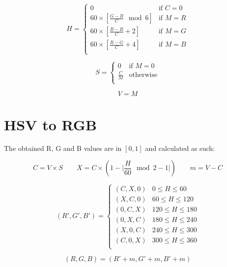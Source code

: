 \documentclass[12pt]{book}
\begin{document}
$$
H =
\begin{cases}
0 & \text{if $C = 0$}\\
60 \times \left[ \frac{G - B}{C} \mod 6\right] & \text{if $M = R$} \\
60 \times \left[ \frac{B - R}{C} + 2\right] & \text{if $M = G$} \\
60 \times \left[ \frac{R - G}{C} + 4\right] & \text{if $M = B$} \\
\end{cases}
$$

$$
S =
\begin{cases}
0 & \text{if $M = 0$}\\
\frac{C}{M}& \text{otherwise} \\
\end{cases}
$$

$$V = M$$

\section{HSV to RGB}

The obtained R, G and B values are in $[0, 1]$ and calculated as such:

\begin{equation*}
    C = V \times S
    \qquad
    X = C \times (1 - \lvert \frac{H}{60} \mod 2 - 1\rvert )
    \qquad
    m = V - C
\end{equation*}

$$
(R', G', B') = 
\begin{cases}
(C, X, 0) & 0 \leq H \leq 60 \\
(X, C, 0) & 60 \leq H \leq 120 \\
(0, C, X) & 120 \leq H \leq 180 \\
(0, X, C) & 180 \leq H \leq 240 \\
(X, 0, C) & 240 \leq H \leq 300 \\
(C, 0, X) & 300 \leq H \leq 360 \\
\end{cases}
$$

$$ (R, G, B) = (R' + m, G' + m, B' + m)$$


\printbibliography
\end{document}
